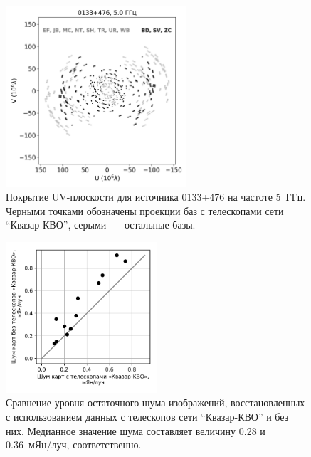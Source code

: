 \begin{figure}
 \centering
 \includegraphics[width=0.6\textwidth]{uv_plot.png}
 \caption{Покрытие UV-плоскости для источника 0133+476 на частоте 5~ГГц. Черными точками
обозначены проекции баз с телескопами сети ``Квазар-КВО'', серыми~--- остальные базы.}
 \label{fig:uv}
\end{figure}

\begin{figure}
 \centering
 \includegraphics[width=0.5\textwidth]{rms_plot.pdf}
 \caption{Сравнение уровня остаточного шума изображений, восстановленных с использованием данных с
          телескопов сети ``Квазар-КВО'' и без них. Медианное значение шума составляет
          величину 0.28 и 0.36~мЯн/луч, соответственно.}
 \label{fig:map_rms}
\end{figure}

